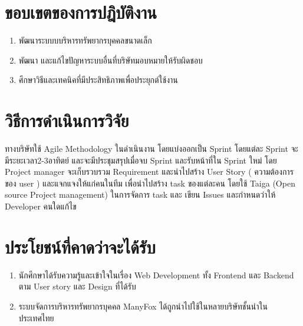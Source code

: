 \section{ขอบเขตของการปฎิบัติงาน}
\begin{enumerate}
  \item พัฒนาระบบบบริหารทรัพยากรบุคคลขนาดเล็ก
  \item พัฒนา และแก้ไขปัญหาระบบอื่นที่บริษัทมอบหมายให้รับผิดชอบ
  \item ศึกษาวิธีและเทคนิคที่มีประสิทธิภาพเพื่อประยุกต์ใช้งาน
\end{enumerate}

\section{วิธีการดำเนินการวิจัย}

ทางบริษัทใช้ Agile Methodology ในดำเนินงาน โดยแบ่งออกเป็น Sprint  โดยแต่ละ Sprint จะมีระยะเวลา2-3อาทิตย์ และจะมีประชุมสรุปเมื่อจบ Sprint และรับหน้าที่ใน Sprint ใหม่ โดย Project manager จะเก็บรวบรวม Requirement และนำไปสร้าง User Story ( ความต้องการของ user ) และแจกแจงให้แก่คนในทีม เพื่อนำไปสร้าง task ของแต่ละคน โดยใช้ Taiga (Open source Project management) ในการจัดการ task และ เขียน Issues และกำหนดว่าให้ Developer คนใดแก้ไข



\section{ประโยชน์ที่คาดว่าจะได้รับ}
\begin{enumerate}
  \item นักศึกษาได้รับความรู้และเข้าใจในเรื่อง Web Development ทั้ง Frontend และ Backend ตาม User story และ Design ที่ได้รับ
  \item ระบบจัดการบริหารทรัพยากรบุคคล ManyFox ได้ถูกนำไปใช้ในหลายบริษัทชั้นนำในประเทศไทย
\end{enumerate}